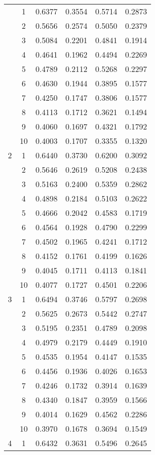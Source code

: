 \begin{center}
\begin{longtable}{|c|c|c|c|c|c|}
\hline
\endlastfoot
1 & 1 & 0.6377 & 0.3554 & 0.5714 & 0.2873 \\
 & 2 & 0.5656 & 0.2574 & 0.5050 & 0.2379 \\
 & 3 & 0.5084 & 0.2201 & 0.4841 & 0.1914 \\
 & 4 & 0.4641 & 0.1962 & 0.4494 & 0.2269 \\
 & 5 & 0.4789 & 0.2112 & 0.5268 & 0.2297 \\
 & 6 & 0.4630 & 0.1944 & 0.3895 & 0.1577 \\
 & 7 & 0.4250 & 0.1747 & 0.3806 & 0.1577 \\
 & 8 & 0.4113 & 0.1712 & 0.3621 & 0.1494 \\
 & 9 & 0.4060 & 0.1697 & 0.4321 & 0.1792 \\
 & 10 & 0.4003 & 0.1707 & 0.3355 & 0.1320 \\
\hline
2 & 1 & 0.6440 & 0.3730 & 0.6200 & 0.3092 \\
 & 2 & 0.5646 & 0.2619 & 0.5208 & 0.2438 \\
 & 3 & 0.5163 & 0.2400 & 0.5359 & 0.2862 \\
 & 4 & 0.4898 & 0.2184 & 0.5103 & 0.2622 \\
 & 5 & 0.4666 & 0.2042 & 0.4583 & 0.1719 \\
 & 6 & 0.4564 & 0.1928 & 0.4790 & 0.2299 \\
 & 7 & 0.4502 & 0.1965 & 0.4241 & 0.1712 \\
 & 8 & 0.4152 & 0.1761 & 0.4199 & 0.1626 \\
 & 9 & 0.4045 & 0.1711 & 0.4113 & 0.1841 \\
 & 10 & 0.4077 & 0.1727 & 0.4501 & 0.2206 \\
\hline
3 & 1 & 0.6494 & 0.3746 & 0.5797 & 0.2698 \\
 & 2 & 0.5625 & 0.2673 & 0.5442 & 0.2747 \\
 & 3 & 0.5195 & 0.2351 & 0.4789 & 0.2098 \\
 & 4 & 0.4979 & 0.2179 & 0.4449 & 0.1910 \\
 & 5 & 0.4535 & 0.1954 & 0.4147 & 0.1535 \\
 & 6 & 0.4456 & 0.1936 & 0.4026 & 0.1653 \\
 & 7 & 0.4246 & 0.1732 & 0.3914 & 0.1639 \\
 & 8 & 0.4340 & 0.1847 & 0.3959 & 0.1566 \\
 & 9 & 0.4014 & 0.1629 & 0.4562 & 0.2286 \\
 & 10 & 0.3970 & 0.1678 & 0.3694 & 0.1549 \\
\hline
4 & 1 & 0.6432 & 0.3631 & 0.5496 & 0.2645 \\

\end{longtable}
\end{center}
